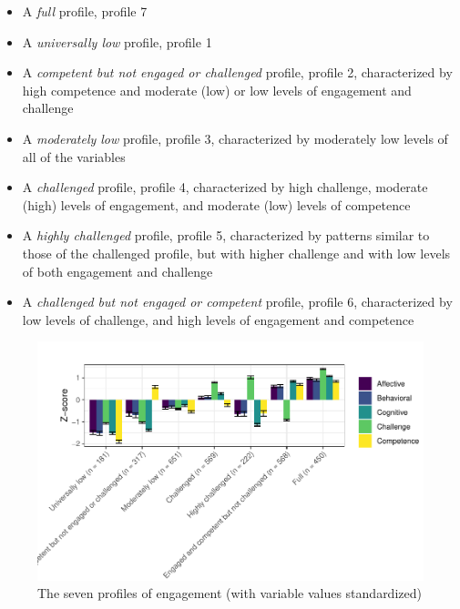 \documentclass[]{msu-thesis}
\providecommand{\tightlist}{%
  \setlength{\itemsep}{0pt}\setlength{\parskip}{0pt}}
\theoremstyle{definition}
\theoremstyle{definition}
\theoremstyle{definition}
\theoremstyle{remark}
\begin{document}
\begin{appendices}
\begin{itemize}
\tightlist
\item
  A \emph{full} profile, profile 7
\item
  A \emph{universally low} profile, profile 1
\item
  A \emph{competent but not engaged or challenged} profile, profile 2,
  characterized by high competence and moderate (low) or low levels of
  engagement and challenge
\item
  A \emph{moderately low} profile, profile 3, characterized by
  moderately low levels of all of the variables
\item
  A \emph{challenged} profile, profile 4, characterized by high
  challenge, moderate (high) levels of engagement, and moderate (low)
  levels of competence
\item
  A \emph{highly challenged} profile, profile 5, characterized by
  patterns similar to those of the challenged profile, but with higher
  challenge and with low levels of both engagement and challenge
\item
  A \emph{challenged but not engaged or competent} profile, profile 6,
  characterized by low levels of challenge, and high levels of
  engagement and competence
\end{itemize}

\begin{figure}

{\centering \includegraphics[width=1\linewidth]{rosenberg-dissertation_files/figure-latex/unnamed-chunk-18-1}

}

\caption{The seven profiles of engagement (with variable values standardized)}\label{fig:unnamed-chunk-18}


\end{figure}
\end{appendices}
\end{document}
